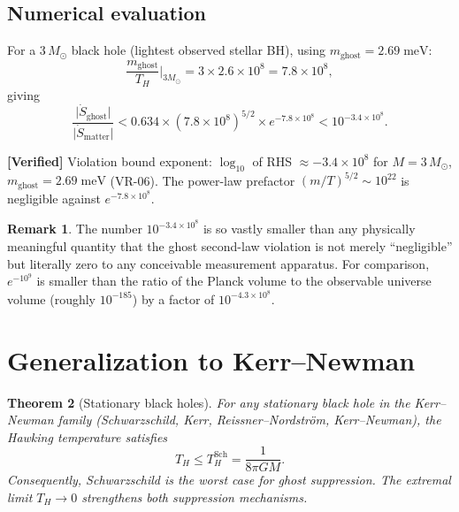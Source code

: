 \documentclass[11pt,a4paper]{article}
\newcommand{\Msun}{M_{\odot}}
\newcommand{\mghost}{m_{\mathrm{ghost}}}
\newcommand{\Thr}{T_{\!\scriptscriptstyle H}}
\theoremstyle{plain}
\newtheorem{theorem}{Theorem}[section]
\theoremstyle{definition}
\newtheorem{remark}[theorem]{Remark}
\newcommand{\verified}[1]{%
  \par\smallskip\noindent
  \colorbox{green!10}{\parbox{\dimexpr\linewidth-2\fboxsep}{%
    \textcolor{green!50!black}{\textbf{[Verified]}} #1}}%
  \par\smallskip}
\begin{document}
\subsection{Numerical evaluation}

For a $3\,\Msun$ black hole (lightest observed stellar BH),
using $\mghost = 2.69\;\mathrm{meV}$:
\begin{equation}
  \frac{\mghost}{\Thr}\Bigg|_{3\Msun}
  = 3\times 2.6\times 10^{8} = 7.8\times 10^{8},
\end{equation}
giving
\begin{equation}\label{eq:bound_3Msun}
  \frac{\lvert\dot S_{\mathrm{ghost}}\rvert}
       {\lvert\dot S_{\mathrm{matter}}\rvert}
  < 0.634\times(7.8\times 10^{8})^{5/2}
    \times e^{-7.8\times 10^{8}}
  < 10^{-3.4\times 10^{8}}.
\end{equation}

\verified{Violation bound exponent: $\log_{10}$ of RHS
$\approx -3.4 \times 10^{8}$ for $M = 3\,\Msun$,
$\mghost = 2.69\;\mathrm{meV}$ (VR-06).
The power-law prefactor $(m/T)^{5/2} \sim 10^{22}$ is negligible
against $e^{-7.8\times 10^8}$.}

\begin{remark}
  The number $10^{-3.4\times 10^{8}}$ is so vastly smaller than any
  physically meaningful quantity that the ghost second-law violation
  is not merely ``negligible'' but literally zero to any conceivable
  measurement apparatus.  For comparison, $e^{-10^9}$ is smaller
  than the ratio of the Planck volume to the observable universe
  volume (roughly $10^{-185}$) by a factor of
  $10^{-4.3\times 10^{8}}$.
\end{remark}


\section{Generalization to Kerr--Newman}\label{sec:kerr_newman}

\begin{theorem}[Stationary black holes]\label{thm:stationary}
  For any stationary black hole in the Kerr--Newman family
  (Schwarzschild, Kerr, Reissner--Nordstr\"om, Kerr--Newman), the
  Hawking temperature satisfies
  \begin{equation}\label{eq:TH_bound}
    \Thr \leq \Thr^{\mathrm{Sch}}
    = \frac{1}{8\pi G M}.
  \end{equation}
  Consequently, Schwarzschild is the \emph{worst case} for ghost
  suppression.  The extremal limit $\Thr \to 0$ strengthens both
  suppression mechanisms.
\end{theorem}
\end{document}
